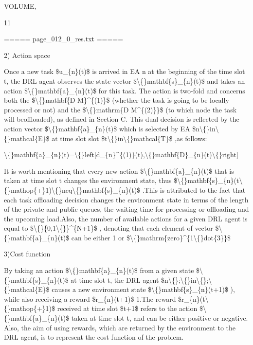 \documentclass{article}
\begin{document}
VOLUME,

11

===== page\_012\_0\_res.txt =====


2) Action space

Once a new task \$u\_\{n\}(t)\$ is arrived in EA n at the beginning of the time slot t, the DRL agent observes the state vector \$\textbackslash\{\}mathbf\{s\}\_\{n\}(t)\$ and takes an action \$\textbackslash\{\}mathbf\{a\}\_\{n\}(t)\$ for this task. The action is two-fold and concerns both the \$\textbackslash\{\}mathbf\{D M\}\textasciicircum{}\{(1)\}\$ (whether the task is going to be locally processed or not) and the \$\textbackslash\{\}mathrm\{D M\textasciicircum{}\{(2)\}\}\$ (to which node the task will beoffloaded), as defined in Section C. This dual decision is reflected by the action vector \$\textbackslash\{\}mathbf\{a\}\_\{n\}(t)\$ which is selected by EA \$n\textbackslash\{\}in\textbackslash\{\}mathcal\{E\}\$ at time slot slot \$t\textbackslash\{\}in\textbackslash\{\}mathcal\{T\}\$ ,as follows:

\textbackslash\{\}mathbf\{a\}\_\{n\}(t)=\textbackslash\{\}left[d\_\{n\}\textasciicircum{}\{(1)\}(t),\textbackslash\{\}mathbf\{D\}\_\{n\}(t)\textbackslash\{\}right]

It is worth mentioning that every new action \$\textbackslash\{\}mathbf\{a\}\_\{n\}(t)\$ that is taken at time slot t changes the environment state, thus \$\textbackslash\{\}mathbf\{s\}\_\{n\}(t\textbackslash\{\}mathop\{+\}1)\textbackslash\{\}neq\textbackslash\{\}mathbf\{s\}\_\{n\}(t)\$ .This is attributed to the fact that each task offloading decision changes the environment state in terms of the length of the private and public queues, the waiting time for processing or offloading and the upcoming load.Also, the number of available actions for a given DRL agent is equal to \$\textbackslash\{\}\{0,1\textbackslash\{\}\}\textasciicircum{}\{N+1\}\$ , denoting that each element of vector \$\textbackslash\{\}mathbf\{a\}\_\{n\}(t)\$ can be either 1 or \$\textbackslash\{\}mathrm\{zero\}\textasciicircum{}\{1\textbackslash\{\}dot\{3\}\}\$

3)Cost function

By taking an action \$\textbackslash\{\}mathbf\{a\}\_\{n\}(t)\$ from a given state \$\textbackslash\{\}mathbf\{s\}\_\{n\}(t)\$ at time slot t, the DRL agent \$n\textbackslash\{\};\textbackslash\{\}in\textbackslash\{\};\textbackslash\{\}mathcal\{E\}\$ causes a new environment state \$\textbackslash\{\}mathbf\{s\}\_\{n\}(t+1)\$ ), while also receiving a reward \$r\_\{n\}(t+1)\$ 1.The reward \$r\_\{n\}(t\textbackslash\{\}mathop\{+\}1)\$ received at time slot \$t+1\$ refers to the action \$\textbackslash\{\}mathbf\{a\}\_\{n\}(t)\$ taken at time slot t, and can be either positive or negative. Also, the aim of using rewards, which are returned by the environment to the DRL agent, is to represent the cost function of the problem.
\end{document}
